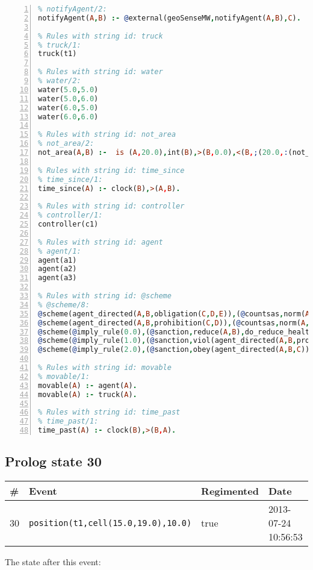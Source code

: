 \documentclass[11pt]{article}\usepackage[utf8]{inputenc}\usepackage{geometry}
\begin{document}
\begin{lstlisting}[language=Prolog, numbers=left]
% Rules with string id: notifyAgent
% notifyAgent/2:
notifyAgent(A,B) :- @external(geoSenseMW,notifyAgent(A,B),C).

% Rules with string id: truck
% truck/1:
truck(t1)

% Rules with string id: water
% water/2:
water(5.0,5.0)
water(5.0,6.0)
water(6.0,5.0)
water(6.0,6.0)

% Rules with string id: not_area
% not_area/2:
not_area(A,B) :-  is (A,20.0),int(B),>(B,0.0),<(B,;(20.0,:(not_area(A,B), is (-(B),20.0)))),int(A),>(A,0.0),<(A,;(20.0,:(area(A,B),-(int(A))))),int(B),>(A,0.0),>(B,0.0),<(A,21.0),<(B,21.0).

% Rules with string id: time_since
% time_since/1:
time_since(A) :- clock(B),>(A,B).

% Rules with string id: controller
% controller/1:
controller(c1)

% Rules with string id: agent
% agent/1:
agent(a1)
agent(a2)
agent(a3)

% Rules with string id: @scheme
% @scheme/8:
@scheme(agent_directed(A,B,obligation(C,D,E)),(@countsas,norm(A,B,F,obligation(C,D,E)),F),false,(listTrue(C)),(time_past(D)),false,[plus(viol(agent_directed(A,B,obligation(C,D,E))))|[]],[plus(obey(agent_directed(A,B,obligation(C,D,E))))|[]])
@scheme(agent_directed(A,B,prohibition(C,D)),(@countsas,norm(A,B,E,prohibition(C,D)),E),(listTrue(C)),false,(false),false,[plus(viol(agent_directed(A,B,prohibition(C,D))))|[]],[plus(obey(agent_directed(A,B,prohibition(C,D))))|[]])
@scheme(@imply_rule(0.0),(@sanction,reduce(A,B),do_reduce_health(A,B),notifyAgent(A,changed(status))),true,false,false,false,[min(reduce(A,B))|[]],[])
@scheme(@imply_rule(1.0),(@sanction,viol(agent_directed(A,B,prohibition(C,D))),do_sanction(D)),true,false,false,false,[min(viol(agent_directed(A,B,prohibition(C,D))))|[]],[])
@scheme(@imply_rule(2.0),(@sanction,obey(agent_directed(A,B,C))),true,false,false,false,[min(obey(agent_directed(A,B,C)))|[]],[])

% Rules with string id: movable
% movable/1:
movable(A) :- agent(A).
movable(A) :- truck(A).

% Rules with string id: time_past
% time_past/1:
time_past(A) :- clock(B),>(B,A).

\end{lstlisting}
\clearpage 
\subsection{Prolog state 30}
\begin{table}[ht]
\centering 
\begin{tabular}{l l l l} 
\textbf{\#} & \textbf{Event} & \textbf{Regimented} & \textbf{Date} \\ [0.5ex] 
\hline
30&\texttt{position(t1,cell(15.0,19.0),10.0)}&true&2013-07-24 10:56:53\\ [1ex] \hline\end{tabular}
\end{table}
The state after this event:
\end{document}
